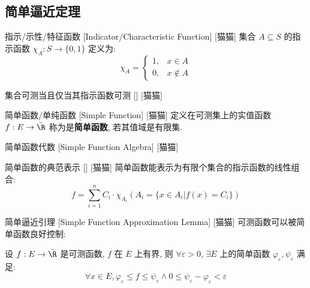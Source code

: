 \documentclass[UTF8]{ctexart}
\begin{document}
        \subsection{简单逼近定理} %
            
            \begin{dfn}
                [IndicatorFunction]
                {指示/示性/特征函数}
                [Indicator/Characteristic Function]
                [猫猫]
                集合 \(A\subseteq S\) 的指示函数 \(\chi_A:S\to\{0,1\}\) 定义为:
                \[\chi_A=
                \begin{cases}
                    1, & x\in A\\
                    0, & x\notin A
                \end{cases}\]
            \end{dfn}
            
            \begin{ppt}
                [MeasurableSetIndicatorFunction]
                {集合可测当且仅当其指示函数可测}
                []
                [猫猫]
            \end{ppt}
            
            \begin{dfn}
                [SimpleFunction]
                {简单函数/单纯函数}
                [Simple Function]
                [猫猫]
                定义在可测集上的实值函数 \(f:E\to\bar{\R}\) 称为是\textbf{简单函数}, 若其值域是有限集. 
            \end{dfn}
            
            \begin{ppt}
                [SimpleFunctionAlgebra]
                {简单函数代数}
                [Simple Function Algebra]
                [猫猫]
            \end{ppt}
            
            \begin{ppt}
                [SimpleFunctionCanonicalRepresentation]
                {简单函数的典范表示}
                []
                [猫猫]
                简单函数能表示为有限个集合的指示函数的线性组合: 
                \[f=\sum_{i=1}^{n}C_i\cdot\chi_{A_i}(A_i=\{x\in A_i|f(x)=C_i\})\]
            \end{ppt}
            
            \begin{lma}
                [SimpleFunctionApproximationLemma]
                {简单逼近引理}
                [Simple Function Approximation Lemma]
                [猫猫]
                可测函数可以被简单函数良好控制: 

                设 \(f:E\to\bar{\R}\) 是可测函数, \(f\) 在 \(E\) 上有界, 则 \(\forall\varepsilon>0\), \(\exists E\) 上的简单函数 \(\varphi_\varepsilon, \psi_\varepsilon\) 满足: 
                \[\forall x\in E, \varphi_\varepsilon\leq f\leq\psi_\varepsilon\wedge 0\leq\psi_\varepsilon-\varphi_\varepsilon<\varepsilon\]
            \end{lma}
            
\end{document}
